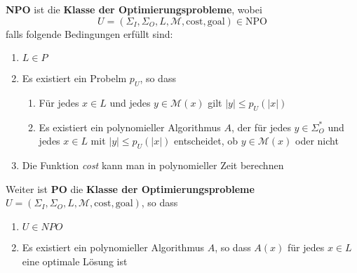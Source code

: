 \documentclass[11pt]{article}
\newcommand{\npo}{\text{NPO}}
\begin{document}
\textbf{NPO} ist die \textbf{Klasse der Optimierungsprobleme}, wobei 
\begin{equation*}
	U = (\Sigma_I, \Sigma_O, L, \mathcal{M}, \text{cost}, \text{goal}) \in \npo
\end{equation*}
falls folgende Bedingungen erf{\"u}llt sind:
\begin{enumerate}[label=(\roman*), noitemsep]
	\item $L \in P$
	\item Es existiert ein Probelm $p_U$, so dass
		\begin{enumerate}
			\item F{\"u}r jedes $x \in L$ und jedes $y \in \mathcal{M}(x)$ gilt $|y| \leq p_U(|x|)$
			\item Es existiert ein polynomieller Algorithmus $A$, der f{\"u}r jedes $y \in \Sigma_O^*$ und jedes $x \in L$ mit $|y| \leq p_U(|x|)$ entscheidet, ob $y \in \mathcal{M}(x)$ oder nicht
		\end{enumerate}
	\item Die Funktion \emph{cost} kann man in polynomieller Zeit berechnen
\end{enumerate}

Weiter ist \textbf{PO} die \textbf{Klasse der Optimierungsprobleme} $U = (\Sigma_I, \Sigma_O, L, \mathcal{M}, \text{cost}, \text{goal})$, so dass
\begin{enumerate}[label=(\roman*), noitemsep]
	\item $U \in NPO$
	\item Es existiert ein polynomieller Algorithmus $A$, so dass $A(x)$ f{\"u}r jedes $x \in L$ eine optimale L{\"o}sung ist
\end{enumerate}
\end{document}
